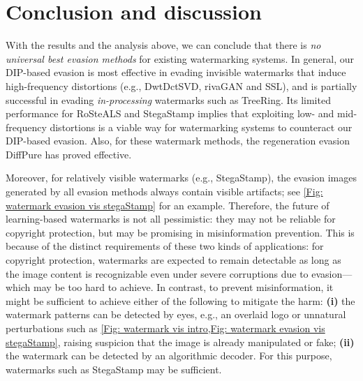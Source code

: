 \section{Conclusion and discussion}
\label{Sec: Summary}

With the results and the analysis above, we can conclude that there is \emph{no universal best evasion methods} for existing watermarking systems. In general, our DIP-based evasion is most effective in evading invisible watermarks that induce high-frequency distortions (e.g., DwtDctSVD, rivaGAN and SSL), and is partially successful  in evading \emph{in-processing} watermarks such as TreeRing. Its limited performance for RoSteALS and StegaStamp implies that exploiting low- and mid-frequency distortions is a viable way for watermarking systems to counteract our DIP-based evasion. Also, for these watermark methods, the regeneration evasion DiffPure has proved effective.  

Moreover, for relatively visible watermarks (e.g., StegaStamp), the evasion images generated by all evasion methods always contain visible artifacts; see \cref{Fig: watermark evasion vis stegaStamp} for an example. Therefore, the future of learning-based watermarks is not all pessimistic: they may not be reliable for copyright protection, but may be promising in misinformation prevention. This is because of the distinct requirements of these two kinds of applications: for copyright protection, watermarks are expected to remain detectable as long as the image content is recognizable even under severe corruptions due to evasion---which may be too hard to achieve. In contrast, to prevent misinformation, it might be sufficient to achieve either of the following to mitigate the harm: \textbf{(i)} the watermark patterns can be detected by eyes, e.g., an overlaid logo or unnatural perturbations such as \cref{Fig: watermark vis intro,Fig: watermark evasion vis stegaStamp}, raising suspicion that the image is already manipulated or fake; \textbf{(ii)} the watermark can be detected by an algorithmic decoder. For this purpose, watermarks such as StegaStamp may be sufficient. 